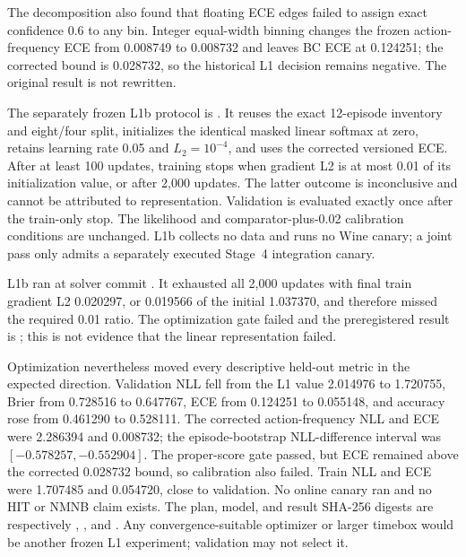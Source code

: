 \documentclass[11pt]{article}
\begin{document}
The decomposition also found that floating ECE edges failed to assign exact
confidence 0.6 to any bin.  Integer equal-width binning changes the frozen
action-frequency ECE from 0.008749 to 0.008732 and leaves BC ECE at 0.124251;
the corrected bound is 0.028732, so the historical L1 decision remains
negative.  The original result is not rewritten.

The separately frozen L1b protocol is
.  It reuses the exact
12-episode inventory and eight/four split, initializes the identical masked
linear softmax at zero, retains learning rate 0.05 and $L_2=10^{-4}$, and uses
the corrected versioned ECE.  After at least 100 updates, training stops when
gradient L2 is at most 0.01 of its initialization value, or after 2,000 updates.
The latter outcome is inconclusive and cannot be attributed to representation.
Validation is evaluated exactly once after the train-only stop.  The likelihood
and comparator-plus-0.02 calibration conditions are unchanged.  L1b collects
no data and runs no Wine canary; a joint pass only admits a separately executed
Stage~4 integration canary.

L1b ran at solver commit
.  It exhausted all 2,000
updates with final train gradient L2 0.020297, or 0.019566 of the initial
1.037370, and therefore missed the required 0.01 ratio.  The optimization gate
failed and the preregistered result is
; this is not evidence that
the linear representation failed.

Optimization nevertheless moved every descriptive held-out metric in the
expected direction.  Validation NLL fell from the L1 value 2.014976 to
1.720755, Brier from 0.728516 to 0.647767, ECE from 0.124251 to 0.055148, and
accuracy rose from 0.461290 to 0.528111.  The corrected action-frequency NLL
and ECE were 2.286394 and 0.008732; the episode-bootstrap NLL-difference
interval was $[-0.578257,-0.552904]$.  The proper-score gate passed, but ECE
remained above the corrected 0.028732 bound, so calibration also failed.  Train
NLL and ECE were 1.707485 and 0.054720, close to validation.  No online canary
ran and no HIT or NMNB claim exists.  The plan, model, and result SHA-256
digests are respectively
,
,
and
.
Any convergence-suitable optimizer or larger timebox would be another frozen
L1 experiment; validation may not select it.
\end{document}
